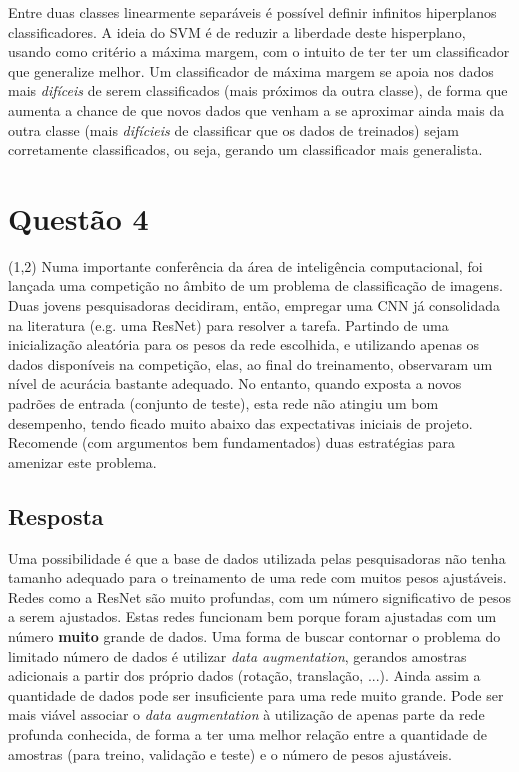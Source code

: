 \documentclass[final,3p]{elsarticle}
\numberwithin{equation}{section}
\begin{document}
        Entre duas classes linearmente separáveis é possível definir infinitos hiperplanos classificadores. A ideia do SVM é de reduzir a liberdade deste hisperplano, usando como critério a máxima margem, com o intuito de ter ter um classificador que generalize melhor. Um classificador de máxima margem se apoia nos dados mais \emph{difíceis} de serem classificados (mais próximos da outra classe), de forma que aumenta a chance de que novos dados que venham a se aproximar ainda mais da outra classe (mais \emph{difícieis} de classificar que os dados de treinados) sejam corretamente classificados, ou seja, gerando um classificador mais generalista.

\section{Questão 4}

    (1,2) Numa importante conferência da área de inteligência computacional, foi lançada uma competição no âmbito de um problema de classificação de imagens. Duas jovens pesquisadoras decidiram, então, empregar uma CNN já consolidada na literatura (e.g. uma ResNet) para resolver a tarefa. Partindo de uma inicialização aleatória para os pesos da rede escolhida, e utilizando apenas os dados disponíveis na competição, elas, ao final do treinamento, observaram um nível de acurácia bastante adequado. No entanto, quando exposta a novos padrões de entrada (conjunto de teste), esta rede não atingiu um bom desempenho, tendo ficado muito abaixo das expectativas iniciais de projeto. Recomende (com argumentos bem fundamentados) duas estratégias para amenizar este problema.

    \subsection{Resposta}

        Uma possibilidade é que a base de dados utilizada pelas pesquisadoras não tenha tamanho adequado para o treinamento de uma rede com muitos pesos ajustáveis. Redes como a ResNet são muito profundas, com um número significativo de pesos a serem ajustados. Estas redes funcionam bem porque foram ajustadas com um número \textbf{muito} grande de dados. Uma forma de buscar contornar o problema do limitado número de dados é utilizar \emph{data augmentation}, gerandos amostras adicionais a partir dos próprio dados (rotação, translação, ...). Ainda assim a quantidade de dados pode ser insuficiente para uma rede muito grande. Pode ser mais viável associar o \emph{data augmentation} à utilização de apenas parte da rede profunda conhecida, de forma a ter uma melhor relação entre a quantidade de amostras (para treino, validação e teste) e o número de pesos ajustáveis.
\end{document}
